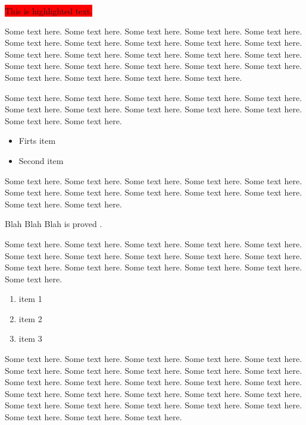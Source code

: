 \documentclass[11pt,twoside]{article}
\theoremstyle{plain}
\theoremstyle{definition}
\theoremstyle{remark}
\begin{document}
\colorbox{red}{This is highlighted text.}

Some text here. Some text here. Some text here. Some text here.
Some text here. Some text here. Some text here. Some text here.
Some text here. Some text here. Some text here. Some text here.
Some text here. Some text here. Some text here. Some text here.
Some text here. Some text here. Some text here. Some text here.
Some text here. Some text here. Some text here. Some text here.



Some text here. Some text here. Some text here. Some text here.
Some text here. Some text here. Some text here. Some text here.
Some text here. Some text here. Some text here. Some text here.


\noindent{\color{MidnightBlue} \rule{\linewidth}{0.5mm} }

\begin{itemize}
\color{ForestGreen}
\item Firts item
\item Second item
\end{itemize}


\noindent{\color{Rhodamine} \rule{\linewidth}{0.5mm} }

Some text here. Some text here. Some text here. Some text here.
Some text here. Some text here. Some text here. Some text here.
Some text here. Some text here. Some text here. Some text here.


Blah Blah Blah is proved \citep{Lee2009}.


Some text here. Some text here. Some text here. Some text here.
Some text here. Some text here. Some text here. Some text here.
Some text here. Some text here. Some text here. Some text here.
Some text here. Some text here. Some text here. Some text here.

\begin{enumerate}
  \item item 1
  \item item 2
  \item item 3
\end{enumerate}

Some text here. Some text here. Some text here. Some text here.
Some text here. Some text here. Some text here. Some text here.
Some text here. Some text here. Some text here. Some text here.
Some text here. Some text here. Some text here. Some text here.
Some text here. Some text here. Some text here. Some text here.
Some text here. Some text here. Some text here. Some text here.
Some text here. Some text here. Some text here. Some text here.
\end{document}
